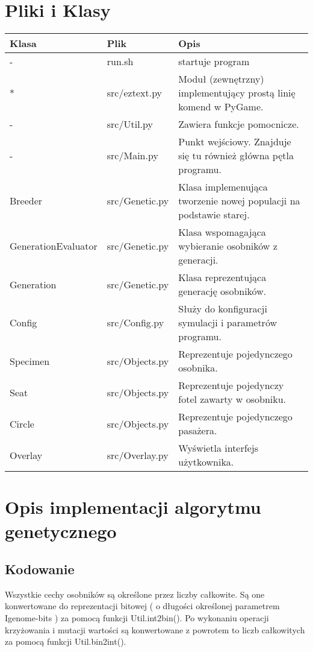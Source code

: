 \documentclass[bibtotocnumbered, headsepline,normalheadings,12pt,polish]{scrreprt}
\begin{document}
\section{Pliki i Klasy}
\begin{tabular}{| l || l | p{6cm} |}
\hline
Klasa & Plik & Opis\\
\hline
\hline
- & run.sh  & startuje program\\
\hline
* & src/eztext.py & Moduł (zewnętrzny) implementujący prostą linię komend w PyGame. \\
\hline
- & src/Util.py & Zawiera funkcje pomocnicze.\\
\hline
- & src/Main.py & Punkt wejściowy. Znajduje się tu również główna pętla programu. \\
\hline
Breeder & src/Genetic.py & Klasa implemenująca tworzenie nowej populacji na podstawie starej.\\
\hline
GenerationEvaluator & src/Genetic.py & Klasa wspomagająca wybieranie osobników z generacji.\\
\hline
Generation & src/Genetic.py & Klasa reprezentująca generację osobników.\\
\hline
Config & src/Config.py & Służy do konfiguracji symulacji i parametrów programu.\\
\hline
Specimen & src/Objects.py & Reprezentuje pojedynczego osobnika.\\
\hline
Seat & src/Objects.py & Reprezentuje pojedynczy fotel zawarty w osobniku.\\
\hline
Circle & src/Objects.py & Reprezentuje pojedynczego pasażera.\\
\hline
Overlay & src/Overlay.py & Wyświetla interfejs użytkownika.\\
\hline
\end{tabular}

\section{Opis implementacji algorytmu genetycznego}
\subsection{Kodowanie}
Wszystkie cechy osobników są określone przez liczby całkowite. Są one konwertowane do reprezentacji bitowej ( o długości określonej parametrem Igenome-bits ) za pomocą funkcji Util.int2bin(). Po wykonaniu operacji krzyżowania i mutacji wartości są konwertowane z powrotem to liczb całkowitych za pomocą funkcji Util.bin2int().
\end{document}
